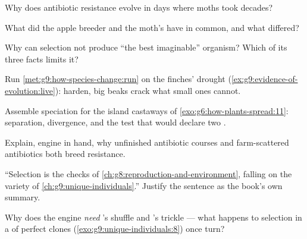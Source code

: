 \begin{exercise}[$\star$]\label{exo:g9:how-species-change:5}
Why does antibiotic resistance evolve in days where moths
took decades?
\end{exercise}

\begin{exercise}[$\star$]\label{exo:g9:how-species-change:6}
What did the apple breeder and the moth's  have in
common, and what differed?
\end{exercise}

\begin{exercise}[$\star\star$]\label{exo:g9:how-species-change:7}
Why can selection not produce ``the best imaginable''
organism? Which of its three facts limits it?
\end{exercise}

\begin{exercise}[$\star\star$]\label{exo:g9:how-species-change:8}
Run \cref{met:g9:how-species-change:run} on the finches'
drought (\cref{ex:g9:evidence-of-evolution:live}): 
harden, big beaks crack what small ones cannot.
\end{exercise}

\begin{exercise}[$\star\star$]\label{exo:g9:how-species-change:9}
Assemble speciation for the island castaways of
\cref{exo:g6:how-plants-spread:11}: separation,
divergence, and the test that would declare two .
\end{exercise}

\begin{exercise}[$\star\star$]\label{exo:g9:how-species-change:10}
Explain, engine in hand, why unfinished antibiotic
courses and farm-scattered antibiotics both breed
resistance.
\end{exercise}

\begin{exercise}[$\star\star$]\label{exo:g9:how-species-change:11}
``Selection is the checks of
\cref{ch:g8:reproduction-and-environment}, falling on the
variety of \cref{ch:g9:unique-individuals}.'' Justify the
sentence as the book's own summary.
\end{exercise}

\begin{exercise}[$\star\star\star$]\label{exo:g9:how-species-change:12}
Why does the engine \emph{need} 's
shuffle and 's trickle --- what happens to
selection in a  of perfect clones
(\cref{exo:g9:unique-individuals:8}) once 
turn?
\end{exercise}

